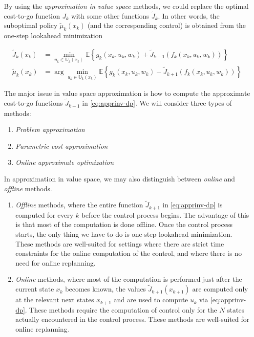 \documentclass[
]{book}
\theoremstyle{definition}
\theoremstyle{definition}
\theoremstyle{definition}
\theoremstyle{definition}
\theoremstyle{remark}
\begin{document}
By using the \emph{approximation in value space} methods, we could replace the optimal cost-to-go function \(J_k\) with some other functions \(\tilde J_k\). In other words, the suboptimal policy \(\tilde{\mu}_k(x_k)\) (and the corresponding control) is obtained from the one-step lookahead minimization

\begin{align}
\tilde{J}_k(x_k) &= \min_{u_k \in \mathbb{U}_k (x_k)} \displaystyle \mathbb{E} \displaystyle \left\{g_k(x_k,u_k,w_k) + \tilde J_{k+1} (f_k(x_k,u_k,w_k) ) \right\} \\
\tilde{\mu}_k(x_k) &= \arg \min_{u_k \in \mathbb{U}_k (x_k)} \displaystyle \mathbb{E} \displaystyle \left\{g_k(x_k,u_k,w_k) + \tilde J_{k+1} (f_k(x_k,u_k,w_k) ) \right\} \label{eq:apprinv-dp}
\end{align}

The major issue in value space approximation is how to compute the approximate cost-to-go functions \(\tilde J_{k+1}\) in \eqref{eq:apprinv-dp}. We will consider three types of methods:

\begin{enumerate}
\def\labelenumi{\arabic{enumi}.}
\item
  \emph{Problem approximation}
\item
  \emph{Parametric cost approximation}
\item
  \emph{Online approximate optimization}
\end{enumerate}

In approximation in value space, we may also distinguish between \emph{online} and \emph{offline} methods.

\begin{enumerate}
\def\labelenumi{\arabic{enumi}.}
\item
  \emph{Offline} methods, where the entire function \(\tilde J_{k+1}\) in \eqref{eq:apprinv-dp} is computed for every \(k\) before the control process begins. The advantage of this is that most of the computation is done offline. Once the control process starts, the only thing we have to do is one-step lookahead minimization. These methods are well-suited for settings where there are strict time constraints for the online computation of the control, and where there is no need for online replanning.
\item
  \emph{Online} methods, where most of the computation is performed just after the current state \(x_k\) becomes known, the values \(\tilde J_{k+1}(x_{k+1})\) are computed only at the relevant next states \(x_{k+1}\) and are used to compute \(u_k\) via \eqref{eq:apprinv-dp}. These methods require the computation of control only for the \(N\) states actually encountered in the control process. These methods are well-suited for online replanning.
\end{enumerate}
\end{document}
